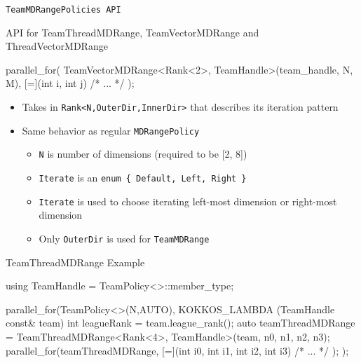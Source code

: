 \begin{frame}[fragile]{\texttt{TeamMDRangePolicies API}}

API for TeamThreadMDRange, TeamVectorMDRange and ThreadVectorMDRange

\vspace{10pt}

\begin{code}[keywords={TeamVectorMDRange}]
 parallel_for(
   TeamVectorMDRange<Rank<2>, TeamHandle>(team_handle, N, M),
   [=](int i, int j) { /* ... */ }
 );
\end{code}

\vspace{10pt}

\begin{itemize}
  \item Takes in \texttt{Rank<N,OuterDir,InnerDir>} that describes its iteration pattern
  \item Same behavior as regular \texttt{MDRangePolicy}
  \begin{itemize}
    \item \texttt{N} is number of dimensions (required to be [2, 8])
    \item \texttt{Iterate} is an \texttt{enum \{ Default, Left, Right \}}
    \item \texttt{Iterate} is used to choose iterating left-most dimension or right-most dimension
    \item Only \texttt{OuterDir} is used for \texttt{TeamMDRange}
  \end{itemize}
\end{itemize}


\end{frame}


\begin{frame}[fragile]{TeamThreadMDRange Example}

\begin{code}[keywords={TeamThreadMDRange}]
using TeamHandle = TeamPolicy<>::member_type;

parallel_for(TeamPolicy<>(N,AUTO),
             KOKKOS_LAMBDA (TeamHandle const& team) {
  int leagueRank = team.league_rank();
  auto teamThreadMDRange = TeamThreadMDRange<Rank<4>,
                           TeamHandle>(team, n0, n1, n2, n3);
  parallel_for(teamThreadMDRange,
    [=](int i0, int i1, int i2, int i3) {
      /* ... */
  });
}); 
\end{code}

\end{frame}

